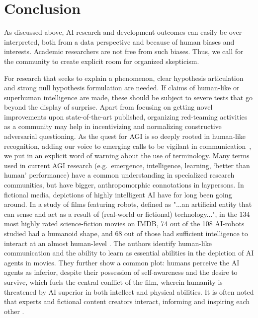 \section{Conclusion}\label{conclude}
As discussed above, AI research and development outcomes can easily be over-interpreted, both from a data perspective and because of human biases and interests. Academic researchers are not free from such biases. Thus, we call for the community to create explicit room for organized skepticism.

For research that seeks to explain a phenomenon, clear hypothesis articulation and strong null hypothesis formulation are needed. If claims of human-like or superhuman intelligence are made, these should be subject to severe tests \citep{claesen2022severity} that go beyond the display of surprise. Apart from focusing on getting novel improvements upon state-of-the-art published, organizing red-teaming activities as a community may help in incentivizing and normalizing constructive adversarial questioning. As the quest for AGI is so deeply rooted in human-like recognition, adding our voice to emerging calls to be vigilant in communication~\citep{shanahan2024talking}, we put in an explicit word of warning about the use of terminology. Many terms used in current AGI research (e.g.\ emergence, intelligence, learning, `better than human' performance) have a common understanding in specialized research communities, but have bigger, anthropomorphic connotations in laypersons. In fictional media, depictions of highly intelligent AI have for long been going around. In a study of films featuring robots, defined as "...an artificial entity that can sense and act as a result of (real-world or fictional) technology...", in the 134 most highly rated science-fiction movies on IMDB, 74 out of the 108 AI-robots studied had a humanoid shape, and 68 out of those had sufficient intelligence to interact at an almost human-level \citep{saffari2021does}. The authors identify human-like communication and the ability to learn as essential abilities in the depiction of AI agents in movies. They further show a common plot: humans perceive the AI agents as inferior, despite their possession of self-awareness and the desire to survive, which fuels the central conflict of the film, wherein humanity is threatened by AI superior in both intellect and physical abilities. It is often noted that experts and fictional content creators interact, informing and inspiring each other \citep{saffari2021does, neri2020role}.

